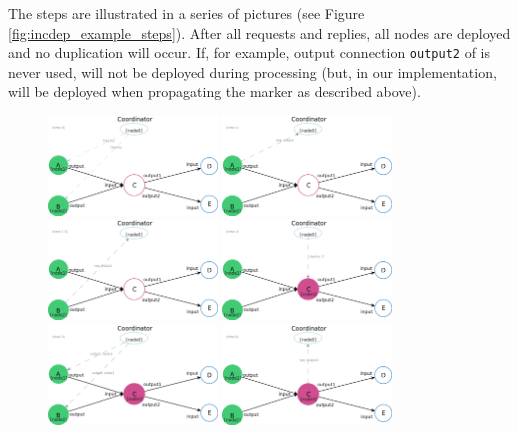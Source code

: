 The steps are illustrated in a series of pictures (see Figure \ref{fig:incdep_example_steps}). After all requests and replies, all nodes are deployed and no duplication will occur. If, for example, output connection \lstinline|output2| of \ndC is never used, \ndE will not be deployed during processing (but, in our implementation, will be deployed when propagating the \dEOS marker as described above).

\begin{figure}[h]\centering
    \includegraphics[width=0.4\textwidth]{figures/incdep_example_1}
    \includegraphics[width=0.4\textwidth]{figures/incdep_example_2}
    \includegraphics[width=0.4\textwidth]{figures/incdep_example_2_5}
    \includegraphics[width=0.4\textwidth]{figures/incdep_example_3}
    \includegraphics[width=0.4\textwidth]{figures/incdep_example_4}
    \includegraphics[width=0.4\textwidth]{figures/incdep_example_5}

\end{figure}
